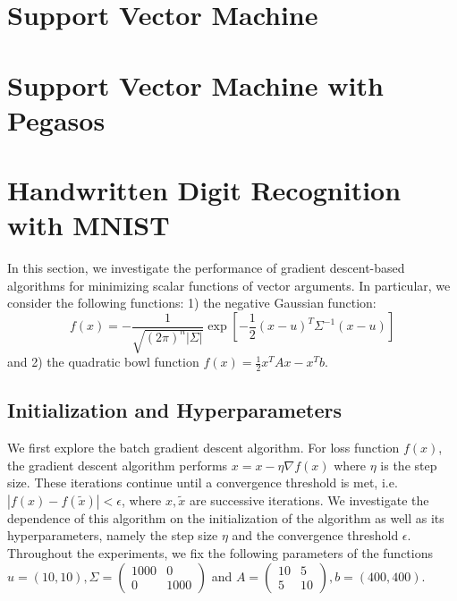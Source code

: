 \documentclass[10pt,psamsfonts]{amsart}
\theoremstyle{definition}
\theoremstyle{remark}
\numberwithin{equation}{section}
\begin{document}
\section{Support Vector Machine}

\section{Support Vector Machine with Pegasos}

\section{Handwritten Digit Recognition with MNIST}













In this section, we investigate the performance of gradient descent-based algorithms for minimizing scalar functions of vector arguments. In particular, we consider the following functions: 1) the negative Gaussian function:
$$f(x) = -\frac{1}{\sqrt{(2\pi)^n |\Sigma|}} \exp\left[ -\frac{1}{2}(x-u)^T\Sigma^{-1}(x-u) \right]$$
and 2) the quadratic bowl function $f(x) = \frac{1}{2}x^TAx - x^Tb$.
\subsection{Initialization and Hyperparameters} We first explore the batch gradient descent algorithm. For loss function $f(x)$, the gradient descent algorithm performs $x = x - \eta \nabla f(x)$
where $\eta$ is the step size. These iterations continue until a convergence threshold is met, i.e. $|f(x) - f(\tilde{x})| < \epsilon$, where $x, \tilde{x}$ are successive iterations. We investigate the dependence of this algorithm on the initialization of the algorithm as well as its hyperparameters, namely the step size $\eta$ and the convergence threshold $\epsilon$. Throughout the experiments, we fix the following parameters of the functions $u = (10, 10),\Sigma = \begin{pmatrix} 1000 & 0 \\ 0 & 1000\end{pmatrix}$ and $A = \begin{pmatrix} 10 & 5 \\ 5 & 10\end{pmatrix},b = (400, 400)$.
\end{document}
